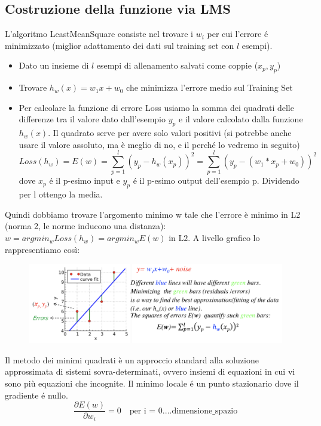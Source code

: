\documentclass{article}
\begin{document}
\subsection{Costruzione della funzione via LMS}
L'algoritmo LeastMeanSquare consiste nel trovare i $w_i$ per cui l'errore é minimizzato (miglior adattamento dei dati sul training set con $l$ esempi).
\begin{itemize}
    \item Dato un insieme di $l$ esempi di allenamento salvati come coppie ($x_p,y_p$)
    \item Trovare $h_w(x)=w_1x+w_0$ che minimizza l'errore medio sul Training Set
    \item Per calcolare la funzione di errore Loss usiamo la somma dei quadrati delle differenze tra il valore dato dall'esempio $y_p$ e il valore calcolato dalla funzione $h_w(x)$. Il quadrato serve per avere solo valori positivi (si potrebbe anche usare il valore assoluto, ma è meglio di no, e il perché lo vedremo in seguito)
    \begin{equation}
        Loss(h_w) = E(w) = \sum_{p = 1}^l (y_p - h_w(x_p))^2 = \sum_{p = 1}^l (y_p - (w_1*x_p + w_0))^2
    \end{equation} 
    dove $x_p$ é il p-esimo input e $y_p$ é il p-esimo output dell'esempio p. Dividendo per l ottengo la media.
\end{itemize}
Quindi dobbiamo trovare l'argomento minimo w tale che l'errore è minimo in L2 (norma 2, le norme inducono una distanza): $w = argmin_wLoss(h_w) = argmin_wE(w) \text{ in L2}$. A livello grafico lo rappresentiamo così: 
\begin{figure}[H]
    \centering
    \includegraphics[scale=0.45]{Images/lmsgrafico.png}
\end{figure}
Il metodo dei minimi quadrati è un approccio standard alla soluzione approssimata di sistemi sovra-determinati, ovvero insiemi di equazioni in cui vi sono più equazioni che incognite. \newline
Il minimo locale é un punto stazionario dove il gradiente é nullo.
\begin{equation}
    \frac{\partial E(w)}{\partial w_i} = 0 \quad \text{per i = 0....dimensione\_spazio}
\end{equation}
\end{document}

